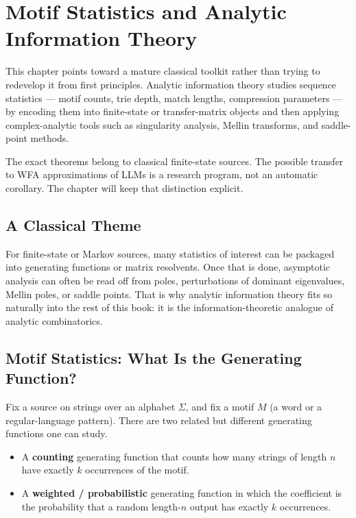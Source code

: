 \chapter{Motif Statistics and Analytic Information Theory}
\label{ch17}

This chapter points toward a mature classical toolkit rather than trying to redevelop it from first principles. Analytic information theory studies sequence statistics --- motif counts, trie depth, match lengths, compression parameters --- by encoding them into finite-state or transfer-matrix objects and then applying complex-analytic tools such as singularity analysis, Mellin transforms, and saddle-point methods.

The exact theorems belong to classical finite-state sources. The possible transfer to WFA approximations of LLMs is a research program, not an automatic corollary. The chapter will keep that distinction explicit.

\section{A Classical Theme}

For finite-state or Markov sources, many statistics of interest can be packaged into generating functions or matrix resolvents. Once that is done, asymptotic analysis can often be read off from poles, perturbations of dominant eigenvalues, Mellin poles, or saddle points. That is why analytic information theory fits so naturally into the rest of this book: it is the information-theoretic analogue of analytic combinatorics.

\section{Motif Statistics: What Is the Generating Function?}

Fix a source on strings over an alphabet $\Sigma$, and fix a motif $M$ (a word or a regular-language pattern). There are two related but different generating functions one can study.

\begin{itemize}
  \item A \textbf{counting} generating function that counts how many strings of length $n$ have exactly $k$ occurrences of the motif.
  \item A \textbf{weighted / probabilistic} generating function in which the coefficient is the probability that a random length-$n$ output has exactly $k$ occurrences.
\end{itemize}

